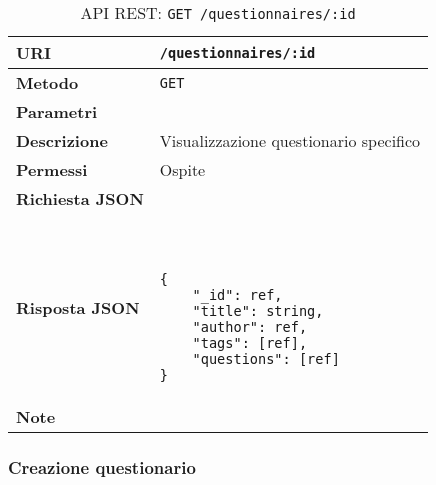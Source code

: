         \begin{table}[H]
            \begin{center}
                \begin{tabular}{p{} p{}}
                    \toprule
                    \textbf{URI} & \texttt{/questionnaires/:id} \\ \midrule
                    \textbf{Metodo} & \texttt{GET} \\ \midrule
                    \textbf{Parametri} & \\ \midrule
                    \textbf{Descrizione} & Visualizzazione questionario specifico \\ \midrule
                    \textbf{Permessi} & Ospite \\ \midrule
                    \textbf{Richiesta JSON} & \\ \midrule
                    \textbf{Risposta JSON} & \
                        \begin{lstlisting}[basicstyle={\ttfamily}]
{
    "_id": ref,
    "title": string,
    "author": ref,
    "tags": [ref],
    "questions": [ref] 
}
                        \end{lstlisting}
                        \\ \midrule
                    \textbf{Note} & \\
                    \bottomrule
                \end{tabular}
                \caption{API REST: \texttt{GET /questionnaires/:id}}
            \end{center}
        \end{table}

    \subsubsection{Creazione questionario}


